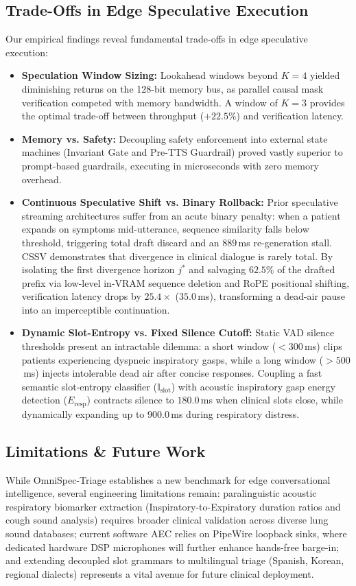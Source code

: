 \documentclass[10pt,journal,compsoc]{IEEEtran}
\begin{document}
\subsection{Trade-Offs in Edge Speculative Execution}
Our empirical findings reveal fundamental trade-offs in edge speculative execution:
\begin{itemize}
    \item \textbf{Speculation Window Sizing:} Lookahead windows beyond $K=4$ yielded diminishing returns on the 128-bit memory bus, as parallel causal mask verification competed with memory bandwidth. A window of $K=3$ provides the optimal trade-off between throughput ($+22.5\%$) and verification latency.
    \item \textbf{Memory vs. Safety:} Decoupling safety enforcement into external state machines (Invariant Gate and Pre-TTS Guardrail) proved vastly superior to prompt-based guardrails, executing in microseconds with zero memory overhead.
    \item \textbf{Continuous Speculative Shift vs. Binary Rollback:} Prior speculative streaming architectures suffer from an acute binary penalty: when a patient expands on symptoms mid-utterance, sequence similarity falls below threshold, triggering total draft discard and an $889$\,ms re-generation stall. CSSV demonstrates that divergence in clinical dialogue is rarely total. By isolating the first divergence horizon $j^*$ and salvaging $62.5\%$ of the drafted prefix via low-level in-VRAM sequence deletion and RoPE positional shifting, verification latency drops by $25.4\times$ ($35.0$\,ms), transforming a dead-air pause into an imperceptible continuation.
    \item \textbf{Dynamic Slot-Entropy vs. Fixed Silence Cutoff:} Static VAD silence thresholds present an intractable dilemma: a short window ($<300$\,ms) clips patients experiencing dyspneic inspiratory gasps, while a long window ($>500$\,ms) injects intolerable dead air after concise responses. Coupling a fast semantic slot-entropy classifier ($\mathbb{I}_{\text{slot}}$) with acoustic inspiratory gasp energy detection ($E_{\text{resp}}$) contracts silence to $180.0$\,ms when clinical slots close, while dynamically expanding up to $900.0$\,ms during respiratory distress.
\end{itemize}

\subsection{Limitations \& Future Work}
While OmniSpec-Triage establishes a new benchmark for edge conversational intelligence, several engineering limitations remain: paralinguistic acoustic respiratory biomarker extraction (Inspiratory-to-Expiratory duration ratios and cough sound analysis) requires broader clinical validation across diverse lung sound databases; current
software AEC relies on PipeWire loopback sinks, where dedicated hardware DSP microphones will further enhance hands-free barge-in; and extending decoupled slot grammars to multilingual triage (Spanish, Korean, regional dialects) represents a vital avenue for future clinical deployment.
\end{document}

